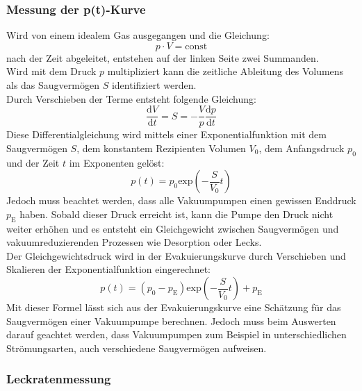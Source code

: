 		\subsubsection{Messung der p(t)-Kurve}
			
			\noindent
			Wird von einem idealem Gas ausgegangen und die Gleichung:
			\begin{equation}
				p \cdot V = \text{const}
			\end{equation}
			nach der Zeit abgeleitet, entstehen auf der linken Seite zwei Summanden. \\
			Wird mit dem Druck $p$ multipliziert kann die zeitliche Ableitung des Volumens als das Saugvermögen $S$ identifiziert werden.\\
			Durch Verschieben der Terme entsteht folgende Gleichung:
			\begin{equation}
				\frac{\text{d}V}{\text{d}t} = S = - \frac{V}{p} \frac{\text{d}p}{\text{d}t}
			\end{equation}
			Diese Differentialgleichung wird mittels einer Exponentialfunktion mit dem Saugvermögen $S$, dem konstantem Rezipienten Volumen $V_0$, dem Anfangsdruck $p_0$ und der Zeit $t$ im Exponenten gelöst:
			\begin{equation}
				p(t) = p_0 \text{exp}\left( - \frac{S}{V_0}t \right)
			\end{equation}
			Jedoch muss beachtet werden, dass alle Vakuumpumpen einen gewissen Enddruck $p_\text{E}$ haben. 
			Sobald dieser Druck erreicht ist, kann die Pumpe den Druck nicht weiter erhöhen und es entsteht ein Gleichgewicht zwischen Saugvermögen und 
			vakuumreduzierenden Prozessen wie Desorption oder Lecks.\\
			Der Gleichgewichtsdruck wird in der Evakuierungskurve durch Verschieben und Skalieren der Exponentialfunktion eingerechnet:
			\begin{equation}
				p(t) = (p_0 - p_\text{E}) \text{exp}\left( - \frac{S}{V_0}t \right) + p_\text{E}
				\label{eqn:druckkurve}
			\end{equation}
			Mit dieser Formel lässt sich aus der Evakuierungskurve eine Schätzung für das Saugvermögen einer Vakuumpumpe berechnen.
			Jedoch muss beim Auswerten darauf geachtet werden, dass Vakuumpumpen zum Beispiel in unterschiedlichen Strömungsarten, auch verschiedene Saugvermögen aufweisen.
			
		\subsubsection{Leckratenmessung}
			

